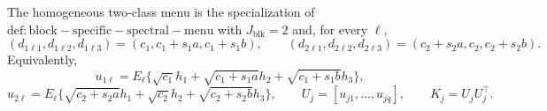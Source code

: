 The homogeneous two-class menu is the specialization of \(\mathrm{def:block-specific-spectral-menu}\) with \(J_{\mathrm{blk}}=2\) and, for every \(\ell\),
\[
(d_{1\ell1},d_{1\ell2},d_{1\ell3})
=(c_1,c_1+s_1a,c_1+s_1b),
\qquad
(d_{2\ell1},d_{2\ell2},d_{2\ell3})
=(c_2+s_2a,c_2,c_2+s_2b).
\]
Equivalently,
\[
u_{1\ell}=E_\ell\{\sqrt{c_1}h_1+\sqrt{c_1+s_1a}h_2+\sqrt{c_1+s_1b}h_3\},
\]
\[
u_{2\ell}=E_\ell\{\sqrt{c_2+s_2a}h_1+\sqrt{c_2}h_2+\sqrt{c_2+s_2b}h_3\},
\qquad
U_j=[u_{j1},\ldots,u_{jq}],
\qquad
K_j=U_jU_j^\top.
\]